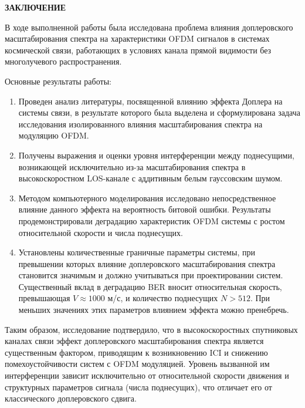 \newpage
\begin{center}
  \textbf{\large ЗАКЛЮЧЕНИЕ}
\end{center}

В ходе выполненной работы была исследована проблема влияния доплеровского масштабирования спектра
на характеристики OFDM сигналов в системах космической связи,
работающих в условиях канала прямой видимости без многолучевого распространения.

Основные результаты работы:
\begin{enumerate}
\item Проведен анализ литературы, посвященной влиянию эффекта Доплера на системы связи,
      в результате которого была выделена и сформулирована задача исследования изолированного
      влияния масштабирования спектра на модуляцию OFDM.
\item Получены выражения
      и оценки уровня интерференции между поднесущими,
      возникающей исключительно из-за масштабирования спектра
      в высокоскоростном LOS-канале с аддитивным белым гауссовским шумом.
\item Методом компьютерного моделирования исследовано непосредственное
      влияние данного эффекта на вероятность битовой ошибки.
      Результаты продемонстрировали деградацию характеристик OFDM системы 
      с ростом относительной скорости и числа поднесущих.
\item Установлены количественные граничные параметры системы,
      при превышении которых влияние доплеровского масштабирования
      спектра становится значимым и должно учитываться при проектировании систем. Существенный вклад в деградацию BER вносит относительная скорость, превышающая $V \approx 1000$ м/с, и количество поднесущих $N > 512$. При меньших значениях этих параметров влиянием эффекта можно пренебречь.
\end{enumerate}

Таким образом, исследование подтвердило, что в высокоскоростных спутниковых каналах связи эффект доплеровского масштабирования спектра является существенным фактором, приводящим к возникновению ICI и снижению помехоустойчивости систем с OFDM модуляцией. Уровень вызванной им интерференции зависит исключительно от относительной скорости движения и структурных параметров сигнала (числа поднесущих), что отличает его от классического доплеровского сдвига.

